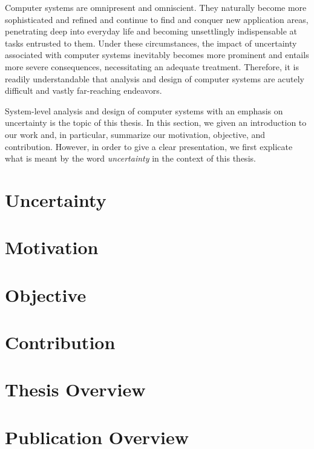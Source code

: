 Computer systems are omnipresent and omniscient. They naturally become more
sophisticated and refined and continue to find and conquer new application
areas, penetrating deep into everyday life and becoming unsettlingly
indispensable at tasks entrusted to them. Under these circumstances, the impact
of uncertainty associated with computer systems inevitably becomes more
prominent and entails more severe consequences, necessitating an adequate
treatment. Therefore, it is readily understandable that analysis and design of
computer systems are acutely difficult and vastly far-reaching endeavors.

System-level analysis and design of computer systems with an emphasis on
uncertainty is the topic of this thesis. In this section, we given an
introduction to our work and, in particular, summarize our motivation,
objective, and contribution. However, in order to give a clear presentation, we
first explicate what is meant by the word \emph{uncertainty} in the context of
this thesis.

\section{Uncertainty}

\section{Motivation}

\section{Objective}

\section{Contribution}

\section{\priortitle}

\section{Thesis Overview}

\section{Publication Overview}
